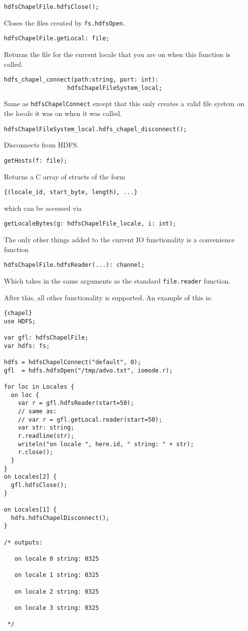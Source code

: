 \begin{lstlisting}
hdfsChapelFile.hdfsClose();
\end{lstlisting}
Closes the files created by {\tt fs.hdfsOpen}.

\begin{lstlisting}
hdfsChapelFile.getLocal: file;
\end{lstlisting}
Returns the file for the current locale that you are on when this function is called.

\begin{lstlisting}
hdfs_chapel_connect(path:string, port: int): 
                  hdfsChapelFileSystem_local;
\end{lstlisting}
Same as {\tt hdfsChapelConnect} except that this only creates a valid file system on the
locale it was on when it was called.

\begin{lstlisting}
hdfsChapelFileSystem_local.hdfs_chapel_disconnect();
\end{lstlisting}
Disconnects from HDFS.

\begin{lstlisting}
getHosts(f: file);
\end{lstlisting}
Returns a C array of structs of the form 
\begin{lstlisting}
{(locale_id, start_byte, length), ...}
\end{lstlisting}
which can be accessed via 
\begin{lstlisting}
getLocaleBytes(g: hdfsChapelFile_locale, i: int);
\end{lstlisting}
The only other things added to the current IO functionality is a convenience function
\begin{lstlisting}
hdfsChapelFile.hdfsReader(...): channel;
\end{lstlisting}
Which takes in the same arguments as the standard {\tt file.reader} function.

After this, all other functionality is supported. An example of this is:
\begin{lstlisting}{chapel}
use HDFS;

var gfl: hdfsChapelFile;
var hdfs: fs;

hdfs = hdfsChapelConnect("default", 0);
gfl  = hdfs.hdfsOpen("/tmp/advo.txt", iomode.r);

for loc in Locales {
  on loc {
    var r = gfl.hdfsReader(start=50);
    // same as:
    // var r = gfl.getLocal.reader(start=50);
    var str: string;
    r.readline(str);
    writeln("on locale ", here.id, " string: " + str);
    r.close();
  }
}
on Locales[2] {
  gfl.hdfsClose();
}

on Locales[1] {
  hdfs.hdfsChapelDisconnect();
}

/* outputs:

   on locale 0 string: 0325

   on locale 1 string: 0325

   on locale 2 string: 0325

   on locale 3 string: 0325

 */
\end{lstlisting}

